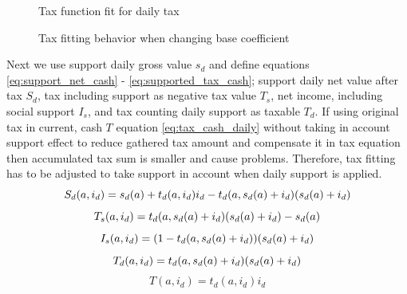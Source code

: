 \begin{figure} %
 \begin{center}
  \caption{Tax function fit for daily tax}
  \label{fig:DailyTax} 
 \end{center}
\end{figure}
\begin{figure} %
 \begin{center}
  \caption{Tax fitting behavior when changing base coefficient}
  \label{fig:BaseTax} 
 \end{center}
\end{figure}

Next we use support daily gross value $s_d$ and define equations
\ref{eq:support_net_cash} - \ref{eq:supported_tax_cash}; support daily net
value after tax $S_d$, tax including support as negative tax value $T_s$,
net income, including social support $I_s$, and tax counting daily support
as taxable $T_d$. If using original tax in current, cash $T$ equation
\ref{eq:tax_cash_daily} without taking in account support effect to reduce
gathered tax amount and compensate it in tax equation then accumulated tax
sum is smaller and cause problems. Therefore, tax fitting has to be adjusted
to take support in account when daily support is applied.
\begin{equation} \label{eq:support_net_cash} \index{support daily}
S_d(a,i_d) = s_d(a) + t_d(a,i_d)i_d - t_d(a,s_d(a)+i_d)(s_d(a)+i_d)
\end{equation}
\begin{equation} \label{eq:supported_tax_cash} \index{tax negative}
T_s(a,i_d)=t_d(a,s_d(a)+i_d)(s_d(a)+i_d)-s_d(a)
\end{equation}
\begin{equation} \label{eq:supported_cash_net} \index{income supported}
I_s(a,i_d)=(1-t_d(a,s_d(a)+i_d))(s_d(a)+i_d)
\end{equation}
\begin{equation} \label{eq:supported_tax_cash_daily} \index{tax daily}
T_d(a,i_d)=t_d(a,s_d(a)+i_d)(s_d(a)+i_d)
\end{equation}
\begin{equation} \label{eq:tax_cash_daily}
T(a,i_d)=t_d(a,i_d)i_d
\end{equation}

